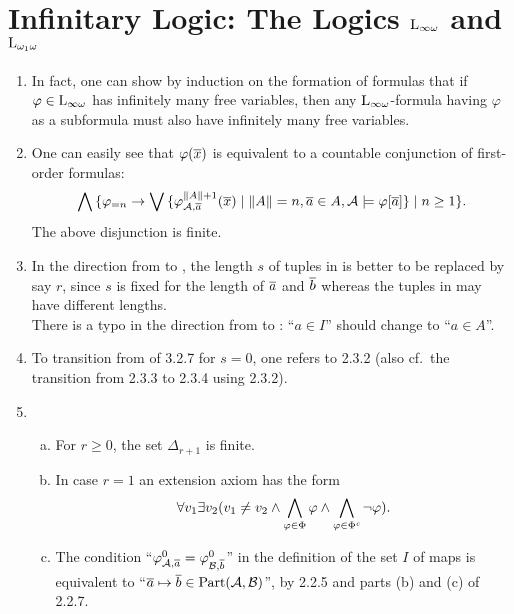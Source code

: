 \section{Infinitary Logic: The Logics $\logic{\infty\omega}$ and $\logic{\omega_1\omega}$}
\begin{enumerate}[1.]
%
\item {} In fact, one can show by induction on the formation of formulas that if $\varphi \in \logic{\infty\omega}$ has infinitely many free variables, then any $\logic{\infty\omega}$-formula having $\varphi$ as a subformula must also have infinitely many free variables.
%
\item {} One can easily see that $\varphi(\overline{x})$ is equivalent to a countable conjunction of first-order formulas:
\[
\bigwedge {\{\varphi_{= n} \rightarrow\bigvee{\{\varphi^{\|A\| + 1}_{\mathcal{A}, \overline{a}}(\overline{x}) \mid \|A\| = n, \overline{a} \in A, \mathcal{A} \models\varphi[\overline{a}]\}} \mid n \geq 1\}}.
\]
The above disjunction is finite.
%
\item {} In the direction from  to , the length $s$ of tuples in  is better to be replaced by say $r$, since $s$ is fixed for the length of $\overline{a}$ and $\overline{b}$ whereas the tuples in  may have different lengths.
\medskip\\
There is a typo in the direction from  to : ``$a \in I$'' should change to ``$a \in A$''.
%
\item {} To transition from  of 3.2.7 for $s = 0$, one refers to 2.3.2 (also cf.\ the transition from 2.3.3 to 2.3.4 using 2.3.2).
%
\item {}
\begin{enumerate}[(a)]
\item For $r \geq 0$, the set $\Delta_{r + 1}$ is finite.
\item In case $r = 1$ an extension axiom has the form
\[
\forall v_1 \exists v_2 (v_1 \neq v_2 \land \bigwedge_{\varphi \in \Phi} \varphi \land \bigwedge_{\varphi \in \Phi^\mathit{c}} \neg\varphi).
\]
\item The condition ``$\varphi^{0}_{\mathcal{A}, \overline{a}} = \varphi^{0}_{\mathcal{B}, \overline{b}}$'' in the definition of the set $I$ of maps is equivalent to ``$\overline{a} \mapsto \overline{b} \in \mathrm{Part}(\mathcal{A}, \mathcal{B})$'', by 2.2.5 and parts (b) and (c) of 2.2.7.

\end{enumerate}
\end{enumerate}
